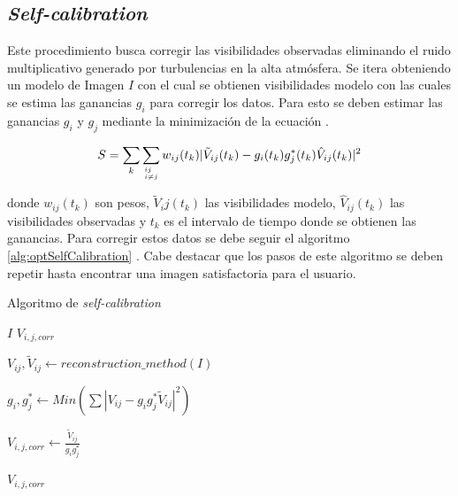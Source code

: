 \subsection{\textit{Self-calibration}}
\label{sec:selfcal}

Este procedimiento busca corregir las visibilidades observadas eliminando el ruido multiplicativo generado por turbulencias en la alta atmósfera. Se itera obteniendo un modelo de Imagen $I$ con el cual se obtienen visibilidades modelo con las cuales se estima las ganancias $g_i$ para corregir los datos. Para esto se deben estimar las ganancias $g_i$ y $g_j$ mediante la minimización de la ecuación .

\begin{equation}
    S = \sum_{k}\sum_{\genfrac{}{}{0pt}{}{ij\hfill}{i \neq j\hfill}} w_{ij}(t_k) |\tilde{V}_{ij}(t_k) - g_i(t_k)g_{j}^*(t_k)\hat{V}_{ij}(t_k)|^2
    \label{eq:min_self}
\end{equation}

donde $w_{ij}(t_k)$ son pesos, $\tilde{V}_ij(t_k)$ las visibilidades modelo, $\hat{V}_{ij}(t_k)$ las visibilidades observadas y $t_{k}
$ es el intervalo de tiempo donde se obtienen las ganancias. Para corregir estos datos se debe seguir el algoritmo \ref{alg:optSelfCalibration} \citep{selfCalibration}. Cabe destacar que los pasos de este algoritmo se deben repetir hasta encontrar una imagen satisfactoria para el usuario. 

\begin{algorithm}[!ht]
	\caption{Algoritmo de \textit{self-calibration}}
	\label{alg:optSelfCalibration}
	\begin{algorithmic}[1]
	\REQUIRE $I$
	\ENSURE $V_{i,j,corr}$

        \STATE $V_{ij}, \tilde{V}_{ij} \gets reconstruction\_method(I)$

        \STATE $g_{i} , g_{j}^{*} \gets Min( \sum |V_{ij} - g_{i}g_{j}^{*}\tilde{V}_{ij}|^2)$  

        \STATE $V_{i,j,corr} \gets \frac{\tilde{V}_{ij}}{g_{i}g_{j}^{*}}$

        \Return $V_{i,j,corr}$
	
	\end{algorithmic}
\end{algorithm}

